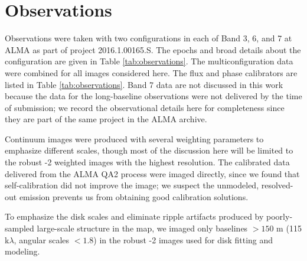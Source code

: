 \documentclass[twocolumn]{aastex61}
\newcommand{\sourcei}{SrcI}
\begin{document}
\section{Observations}
\label{sec:observations}

Observations were taken with two configurations in each of Band 3, 6, and 7 at
ALMA as part of project 2016.1.00165.S.  The epochs and broad details about the
configuration are given in Table \ref{tab:observations}.  The
multiconfiguration data were combined for all
images considered here.
The flux and phase calibrators are listed in Table \ref{tab:observations}.
Band 7 data are not discussed in this work because the data for
the long-baseline observations were not delivered by the time of submission; we
record the observational details here for completeness since they are part of
the same project in the ALMA archive.

Continuum images were produced with several weighting parameters to emphasize
different scales, though most of the discussion here will be limited to the
robust -2 weighted images with the highest resolution.  The calibrated data
delivered from the ALMA QA2 process were imaged directly, since we found
that self-calibration did not improve the image; we suspect the unmodeled, resolved-out
emission prevents us from obtaining good calibration solutions.

To emphasize the disk scales and eliminate ripple artifacts produced by
poorly-sampled large-scale structure in the map, we imaged only baselines
$>150$ m (115 k$\lambda$, angular scales $<1.8$\arcsec) in the robust -2 images
used for disk fitting and modeling.

\end{document}
